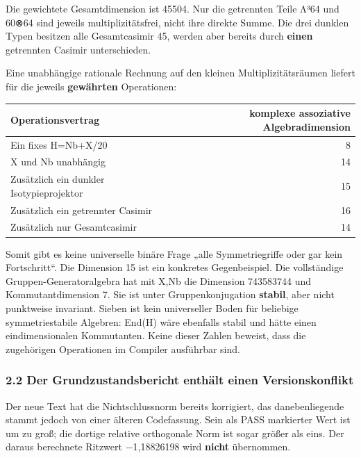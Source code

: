 Die gewichtete Gesamtdimension ist 45504. Nur die getrennten Teile Λ³64
und 60⊗64 sind jeweils multiplizitätsfrei, nicht ihre direkte Summe. Die
drei dunklen Typen besitzen alle Gesamtcasimir 45, werden aber bereits
durch \textbf{einen} getrennten Casimir unterschieden.

Eine unabhängige rationale Rechnung auf den kleinen Multiplizitätsräumen
liefert für die jeweils \textbf{gewährten} Operationen:

{\def\LTcaptype{none} %
\begin{longtable}[]{@{}lr@{}}
\toprule\noalign{}
Operationsvertrag & komplexe assoziative Algebradimension \\
\midrule\noalign{}
\endhead
\bottomrule\noalign{}
\endlastfoot
Ein fixes H=Nb+X/20 & 8 \\
X und Nb unabhängig & 14 \\
Zusätzlich ein dunkler Isotypieprojektor & 15 \\
Zusätzlich ein getrennter Casimir & 16 \\
Zusätzlich nur Gesamtcasimir & 14 \\
\end{longtable}
}

Somit gibt es keine universelle binäre Frage „alle Symmetriegriffe oder
gar kein Fortschritt``. Die Dimension 15 ist ein konkretes
Gegenbeispiel. Die vollständige Gruppen-Generatoralgebra hat mit X,Nb
die Dimension 743583744 und Kommutantdimension 7. Sie ist unter
Gruppenkonjugation \textbf{stabil}, aber nicht punktweise invariant.
Sieben ist kein universeller Boden für beliebige symmetriestabile
Algebren: End(H) wäre ebenfalls stabil und hätte einen eindimensionalen
Kommutanten. Keine dieser Zahlen beweist, dass die zugehörigen
Operationen im Compiler ausführbar sind.

\subsubsection{2.2 Der Grundzustandsbericht enthält einen
Versionskonflikt}\label{der-grundzustandsbericht-enthuxe4lt-einen-versionskonflikt}

Der neue Text hat die Nichtschlussnorm bereits korrigiert, das
danebenliegende  stammt jedoch von
einer älteren Codefassung. Sein als PASS markierter Wert ist um
 zu groß; die dortige relative orthogonale Norm ist sogar
größer als eins. Der daraus berechnete Ritzwert −1,18826198 wird
\textbf{nicht} übernommen.

